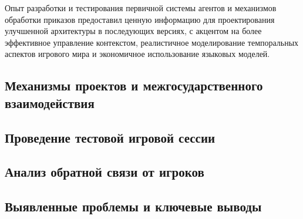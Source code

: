 Опыт разработки и тестирования первичной системы агентов и механизмов обработки приказов предоставил ценную информацию для проектирования улучшенной архитектуры в последующих версиях, с акцентом на более эффективное управление контекстом, реалистичное моделирование темпоральных аспектов игрового мира и экономичное использование языковых моделей.

\subsection{Механизмы проектов и межгосударственного взаимодействия}

\subsection{Проведение тестовой игровой сессии}

\subsection{Анализ обратной связи от игроков}

\subsection{Выявленные проблемы и ключевые выводы}